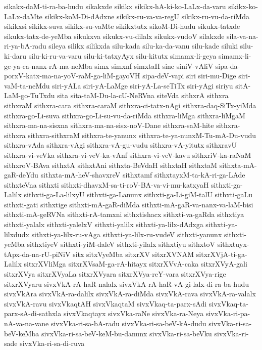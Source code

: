 {sikakx-daM-ti-ra-ba-hudu
sikakxde
sikikx
sikikx-hA-ki-ko-LaLx-da-varu
sikikx-ko-LaLx-daMte
sikikx-koM-Di-dAdxne
sikikx-ru-va-va-regU
sikikx-ru-vu-da-riMda
sikikxsi
sikikx-suva
sikikx-su-vaMte
sikikxtutx
sikoM-Di-hudu
sikukx-tatxde
sikukx-tatx-de-yeMba
sikukxva
sikukx-vu-dilalx
sikukx-vudoV
silakxde
sila-va-na-ri-ya-bA-radu
sileya
silikx
silikxda
silu-kada
silu-ka-da-vanu
silu-kade
siluki
silu-ki-daru
silu-ki-ru-va-varu
silu-ki-tatxyAyx
silu-kitutx
simamx-li-geya
simamx-li-ge-ya-ca-nanx-rA-ma-neMba
simx
simxnf
simxtaH
sine
siniV-vAliV
sipa-da-porxV-katx-ma-na-yoV-raM-ga-liM-gayoVH
sipa-deV-vapi
siri
siri-mu-Dige
siri-vaM-ta-neMdu
siri-yALa
siri-yA-LaMge
siri-yA-La-seTiTx
siri-yAgi
siriyu
sitA-LaM-go-TuTxdu
sita
sita-taM-Du-la-cU-NeRVna
siteVda
sithxrA
sithxra
sithxraM
sithxra-cara
sithxra-caraM
sithxra-ci-tatx-nAgi
sithxra-daq-SiTx-yiMda
sithxra-go-Li-suva
sithxra-go-Li-su-vu-da-riMda
sithxra-liMga
sithxra-liMgaM
sithxra-ma-na-sisxna
sithxra-ma-na-sisx-noV-Dane
sithxra-saM-hite
sithxra-sithxra
sithxra-sithxraM
sithxra-te-yanunx
sithxra-te-ya-nunxM-Tu-mA-Du-vudu
sithxra-vAda
sithxra-vAgi
sithxra-vA-gu-vudu
sithxra-vA-yitutx
sithxravU
sithxra-vi-veVka
sithxra-vi-veV-ka-vAnf
sithxra-vi-veV-kavu
sithxriV-ka-raNaM
sithxroV-BAva
sithxtA
sithxtAni
sithxta-BeVdaH
sithxtaH
sithxtaM
sithxta-mA-gaR-deYdu
sithxta-mA-heV-shavxreV
sithxtamf
sithxtayxM-ta-kA-ri-ga-LAde
sithxteVna
sithxti
sithxti-dhavxM-sa-ti-roV-BA-va-vi-mu-katxyaH
sithxti-ga-Lalilx
sithxti-ga-La-lilxyU
sithxti-ga-Lanunx
sithxti-ga-Li-giM-talU
sithxti-gaLu
sithxti-gati
sithxtige
sithxti-mA-gaR-diMda
sithxti-mA-gaR-va-nanx-va-laM-bisi
sithxti-mA-geRVNa
sithxti-rA-tamxni
sithxtishacx
sithxti-va-gaRda
sithxtiya
sithxti-yalalx
sithxti-yalelxV
sithxti-yalilx
sithxti-ya-lilx-dAdxga
sithxti-ya-lilxdudx
sithxti-ya-lilx-ru-vAga
sithxti-ya-lilx-ru-vudeV
sithxti-yanunx
sithxti-yeMba
sithxtiyeV
sithxti-yiM-daleV
sithxti-yilalx
sithxtiyu
sithxtoV
sithxtuyx-tApx-da-na-rU-piNiV
sitx
sitxVyeMba
sitxrXV
sitxrXVNAM
sitxrXVjA-ti-ga-Lalilx
sitxrXVliMga
sitxrXVsaM-ga-rA-hitayx
sitxrXVvA-caka
sitxrXVyA-gali
sitxrXVya
sitxrXVyaLa
sitxrXVyara
sitxrXVya-reY-vara
sitxrXVya-rige
sitxrXVyaru
sivxVkA-rA-haR-nalalx
sivxVkA-rA-haR-vA-gi-lalx-di-ra-ba-hudu
sivxVkAra
sivxVkA-ra-dalilx
sivxVkA-ra-diMda
sivxVkA-rava
sivxVkA-ra-valalx
sivxVkA-ravu
sivxVkaqtAH
sivxVkaqtaM
sivxVkaq-ta-parx-sAdi
sivxVkaq-ta-parx-sA-di-sathxla
sivxVkaqtayx
sivxVka-raNe
sivxVka-ra-Neya
sivxVka-ri-pa-nA-va-na-vane
sivxVka-ri-sa-bA-radu
sivxVka-ri-sa-beV-kA-dudu
sivxVka-ri-sa-beV-keMba
sivxVka-ri-sa-beV-keM-bu-danunx
sivxVka-ri-sa-beVku
sivxVka-ri-sade
sivxVka-ri-sa-di-ruva
}
